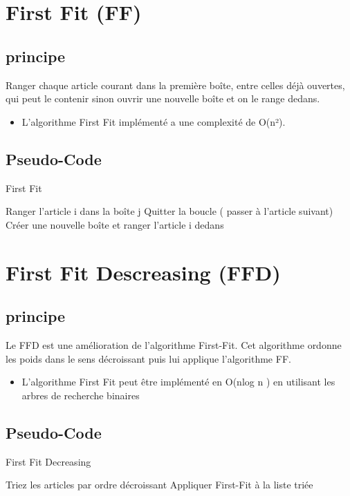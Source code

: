 \documentclass[class=article, crop=false]{standalone}
\begin{document}
\section{First Fit (FF)}
\subsection{principe}
Ranger chaque article courant dans la première boîte, entre celles déjà ouvertes, qui peut le contenir sinon ouvrir une nouvelle boîte et on le range dedans.
\begin{itemize}
    \item L’algorithme First Fit implémenté a une complexité de O(n²). 
\end{itemize}

\subsection{Pseudo-Code}
\begin{algorithm}[H]
    \caption{First Fit}
    \begin{algorithmic}
              \STATE Ranger l’article i dans la boîte j
              \STATE Quitter la boucle ( passer à l'article suivant)
             \ENDIF 
        \ENDFOR
            \STATE Créer une nouvelle boîte et ranger l’article i dedans
        \ENDIF
    \ENDFOR
    \end{algorithmic}
\end{algorithm}

\section{First Fit Descreasing (FFD)}
\subsection{principe}
Le FFD est une amélioration de l’algorithme First-Fit. Cet algorithme ordonne les poids dans le sens décroissant puis lui applique l’algorithme FF.
\begin{itemize}
    \item L’algorithme First Fit peut être implémenté en O(nlog n ) en utilisant les arbres de recherche binaires 
\end{itemize}

\subsection{Pseudo-Code}
\begin{algorithm}
    \caption{First Fit Decreasing }
    \begin{algorithmic}
        \STATE Triez les articles par ordre décroissant
        \STATE Appliquer First-Fit à la liste triée 
    \end{algorithmic}
\end{algorithm}
\end{document}
